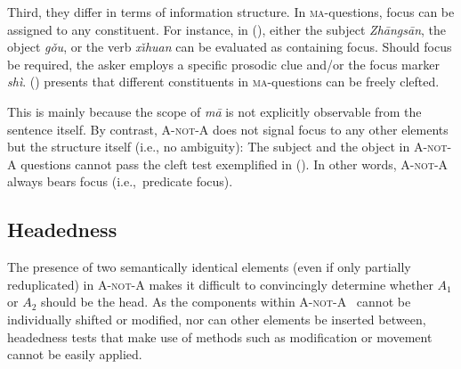 \documentclass[11pt]{article}
\def\anota{\textsc{A-not-A}}
\def\aone{$A_1$}
\def\atwo{$A_2$}
\newcommand{\myref}[1]{(\getref{#1})}
\begin{document}
Third, they differ in terms of information structure. In
\textsc{ma}-questions, focus can be assigned to any constituent. For
instance, in \myref{exe:yesno}, either the subject 
\textit{Zh\={a}ngs\={a}n}, the object 
\textit{g\v{o}u}, or the verb  \textit{x\v{\i}huan}
can be evaluated as containing focus. Should focus be required, the
asker employs a specific prosodic clue and/or the focus marker
 \textit{sh\`{i}}. \myref{exe:shide} presents that
different constituents in \textsc{ma}-questions can be freely clefted.


{\small 
{}}
\vspace{-20pt}


\noindent This is mainly because the scope of \textit{m\={a}} is not
explicitly observable from the sentence itself. By contrast, {\anota}
does not signal focus to any other elements but the structure itself
(i.e., no ambiguity): The subject and the object in {\anota} questions
cannot pass the cleft test exemplified in \myref{exe:shide}. In other
words, {\anota} always bears focus (i.e.,\ predicate focus).





\subsection{Headedness}
\label{ssec:head}

The presence of two semantically identical elements (even if only
partially reduplicated) in {\anota} makes it difficult to convincingly
determine whether {\aone}  or {\atwo} should be the head. As the components
within {\anota} ~cannot be individually shifted or modified, nor can other
elements be inserted between, headedness tests that make use of methods
such as modification or movement cannot be easily applied.
\end{document}
